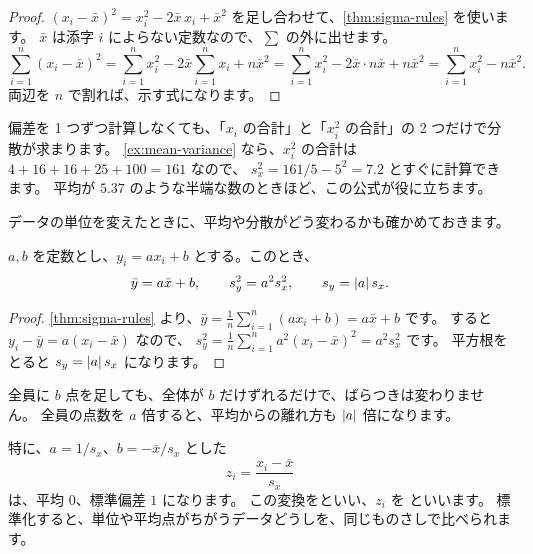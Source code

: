 \begin{proof}
  $(x_i - \bar{x})^2 = x_i^2 - 2\bar{x}\,x_i + \bar{x}^2$ を足し合わせて、\cref{thm:sigma-rules} を使います。
  $\bar{x}$ は添字 $i$ によらない定数なので、$\sum$ の外に出せます。
  \[
    \sum_{i=1}^{n} (x_i - \bar{x})^2
    = \sum_{i=1}^{n} x_i^2 - 2\bar{x} \sum_{i=1}^{n} x_i + n\bar{x}^2
    = \sum_{i=1}^{n} x_i^2 - 2\bar{x} \cdot n\bar{x} + n\bar{x}^2
    = \sum_{i=1}^{n} x_i^2 - n\bar{x}^2.
  \]
  両辺を $n$ で割れば、示す式になります。
\end{proof}

\begin{merit}
  偏差を 1 つずつ計算しなくても、「$x_i$ の合計」と「$x_i^2$ の合計」の 2 つだけで分散が求まります。
  \cref{ex:mean-variance} なら、$x_i^2$ の合計は $4+16+16+25+100 = 161$ なので、
  $s_x^2 = 161/5 - 5^2 = 7.2$ とすぐに計算できます。
  平均が $5.37$ のような半端な数のときほど、この公式が役に立ちます。
\end{merit}

データの単位を変えたときに、平均や分散がどう変わるかも確かめておきます。

\begin{proposition}
  $a, b$ を定数とし、$y_i = a x_i + b$ とする。このとき、
  \[
    \bar{y} = a\bar{x} + b, \qquad s_y^2 = a^2 s_x^2, \qquad s_y = \lvert a\rvert\, s_x.
  \]
\end{proposition}

\begin{proof}
  \cref{thm:sigma-rules} より、$\bar{y} = \frac{1}{n}\sum_{i=1}^{n}(a x_i + b) = a\bar{x} + b$ です。
  すると $y_i - \bar{y} = a(x_i - \bar{x})$ なので、
  $s_y^2 = \frac{1}{n}\sum_{i=1}^{n} a^2 (x_i - \bar{x})^2 = a^2 s_x^2$ です。
  平方根をとると $s_y = \lvert a\rvert\, s_x$ になります。
\end{proof}

\begin{intuition}
  全員に $b$ 点を足しても、全体が $b$ だけずれるだけで、ばらつきは変わりません。
  全員の点数を $a$ 倍すると、平均からの離れ方も $\lvert a\rvert$ 倍になります。
\end{intuition}

特に、$a = 1/s_x$、$b = -\bar{x}/s_x$ とした
\[
  z_i = \frac{x_i - \bar{x}}{s_x}
\]
は、平均 $0$、標準偏差 $1$ になります。
この変換をといい、$z_i$ を といいます。
標準化すると、単位や平均点がちがうデータどうしを、同じものさしで比べられます。

